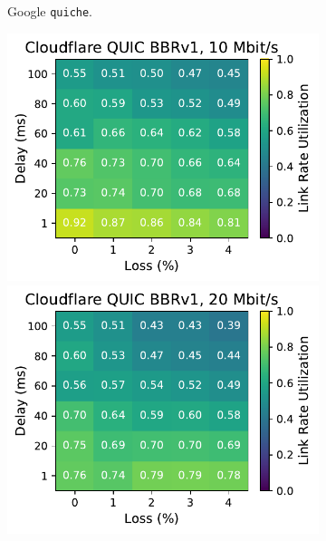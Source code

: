 \begin{figure}[ht]
\begin{subfigure}[b]{0.22\linewidth}
        \caption{Google \texttt{quiche}.}
    \end{subfigure}
    \begin{subfigure}[b]{0.22\linewidth}
        \includegraphics[width=\linewidth,trim={0 0 2cm 0},clip]{figures/heatmaps/heatmap_quiche_bbr1_10mbps.pdf}
        \includegraphics[width=\linewidth,trim={0 0 2cm 0},clip]{figures/heatmaps/heatmap_quiche_bbr1_20mbps.pdf}

\end{subfigure}
\end{figure}
